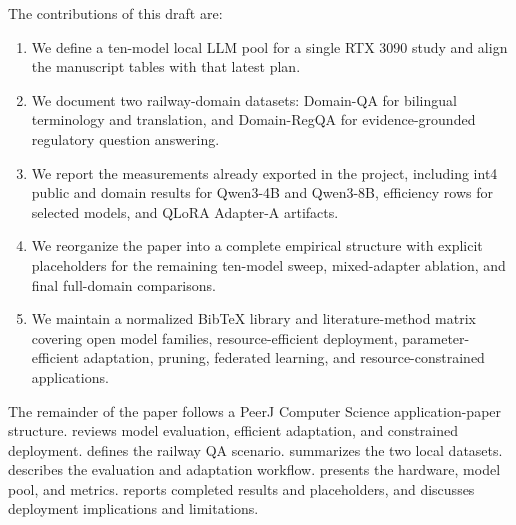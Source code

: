 The contributions of this draft are:
\begin{enumerate}[leftmargin=1.5em]
  \item We define a ten-model local LLM pool for a single RTX 3090 study and
  align the manuscript tables with that latest plan.
  \item We document two railway-domain datasets: Domain-QA for bilingual
  terminology and translation, and Domain-RegQA for evidence-grounded
  regulatory question answering.
  \item We report the measurements already exported in the project, including
  int4 public and domain results for Qwen3-4B and Qwen3-8B, efficiency rows for
  selected models, and QLoRA Adapter-A artifacts.
  \item We reorganize the paper into a complete empirical structure with
  explicit placeholders for the remaining ten-model sweep, mixed-adapter
  ablation, and final full-domain comparisons.
  \item We maintain a normalized BibTeX library and literature-method matrix
  covering open model families, resource-efficient deployment,
  parameter-efficient adaptation, pruning, federated learning, and
  resource-constrained applications.
\end{enumerate}

The remainder of the paper follows a PeerJ Computer Science application-paper
structure.  reviews model evaluation, efficient
adaptation, and constrained deployment.  defines the
railway QA scenario.  summarizes the two local datasets.
 describes the evaluation and adaptation workflow.
 presents the hardware, model pool, and metrics.
 reports completed results and placeholders, and
 discusses deployment implications and limitations.
